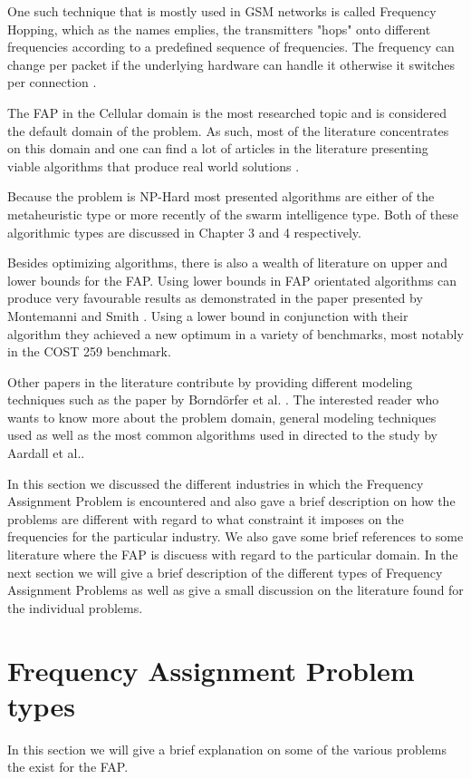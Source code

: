 One such technique that is mostly used in GSM networks is called Frequency Hopping, which as the names emplies, the transmitters "hops" onto different frequencies according to a predefined sequence of frequencies. The frequency can change per packet if the underlying hardware can handle it otherwise it switches per connection \cite{Karen2004,MontemanniThesis,Eisenblatter}.

The FAP in the Cellular domain is the most researched topic and is considered the default domain of the problem. As such, most of the literature concentrates on this domain and one can find a lot of articles in the literature presenting viable algorithms that produce real world solutions \cite{Eisenblatter}. 

Because the problem is NP-Hard most presented algorithms are either of the metaheuristic type or more recently of the swarm intelligence type. Both of these algorithmic types are discussed in Chapter 3 and 4 respectively.

Besides optimizing algorithms, there is also a wealth of literature on upper and lower bounds for the FAP. Using lower bounds in FAP orientated algorithms can produce very favourable results as demonstrated in the paper presented by Montemanni and Smith \cite{TabuMontemanniSmith}. Using a lower bound in conjunction with their algorithm they achieved a new optimum in a variety of benchmarks, most notably in the COST 259 benchmark. 

Other papers in the literature contribute by providing different modeling techniques such as the paper by Borndörfer et al. \cite{FAPOrientationModel}. The interested reader who wants to know more about the problem domain, general modeling techniques used as well as the most common algorithms used in directed to the study by Aardall et al.\cite{Karen2004}.

In this section we discussed the different industries in which the Frequency Assignment Problem is encountered and also gave a brief description on how the problems are different with regard to what constraint it imposes on the frequencies for the particular industry. 
We also gave some brief references to some literature where the FAP is discuess with regard to the particular domain. In the next section we will give a brief description of the different types of Frequency Assignment Problems as well as give a small discussion on the literature found for the individual problems.
\section{Frequency Assignment Problem types}
\label{sec:FAPVariants}
In this section we will give a brief explanation on some of the various problems the exist for the FAP.
